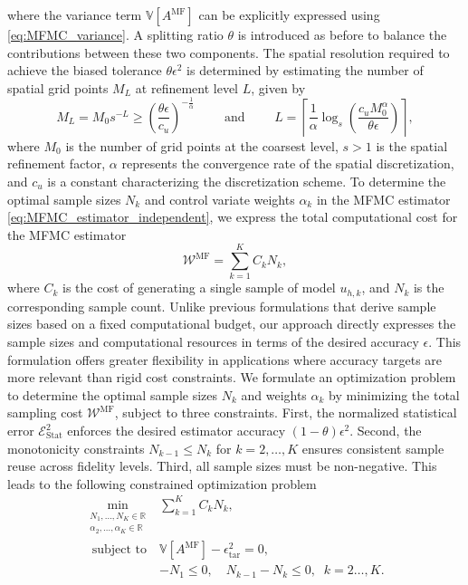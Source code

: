 %
where the variance term $\mathbb{V}[A^{\text{MF}}]$  can be explicitly expressed using \eqref{eq:MFMC_variance}. A splitting ratio $\theta$ is introduced as before to balance the contributions between these two components. The spatial resolution required to achieve the biased tolerance $\theta \epsilon^2$ is determined by estimating the number of spatial grid points $M_L$ at refinement level $L$, given by
%
\begin{equation}
    \label{eq:SLSGC_MLS_SpatialGridsNo}
    M_L = M_0s^{-L} \ge \left(\frac{\theta\epsilon}{c_u}\right)^{-\frac 1 {\alpha}} \qquad \text{ and } \qquad     L = \left\lceil \frac{1}{\alpha}\log_s \left(\frac{c_u M_0^\alpha}{\theta\epsilon}\right) \right\rceil,
\end{equation}
%
where $M_0$ is the number of grid points at the coarsest level, $s>1$ is the spatial refinement factor, $\alpha$ represents the convergence rate of the spatial discretization, and $c_u$ is a constant characterizing the discretization scheme. To determine the optimal sample sizes $N_k$ and control variate weights $\alpha_k$ in the MFMC estimator \eqref{eq:MFMC_estimator_independent}, we express the total computational cost for the MFMC estimator
%
\[
\mathcal{W}^{\text{MF}} = \sum_{k=1}^K C_kN_k,
\]
%
where $C_k$ is the cost of generating a single sample of model $u_{h,k}$, and $N_k$ is the corresponding sample count. Unlike previous formulations \cite{PeWiGu:2016} that derive sample sizes based on a fixed computational budget, our approach directly expresses the sample sizes and computational resources in terms of the desired accuracy $\epsilon$. This formulation offers greater flexibility in applications where accuracy targets are more relevant than rigid cost constraints. We formulate an optimization problem to determine the optimal sample sizes $N_k$ and weights $\alpha_k$ by minimizing the total sampling cost $\mathcal{W}^{\text{MF}}$, subject to three constraints. First, the normalized statistical error $\mathcal{E}_{\text{Stat}}^2$ enforces the desired estimator accuracy $(1-\theta)\epsilon^2$. Second,  the monotonicity constraints $N_{k-1}\le N_k$ for $k=2,\ldots, K$ ensures consistent sample reuse across fidelity levels. Third, all sample sizes must be non-negative. This leads to the following constrained optimization problem
%
\begin{equation}\label{eq:Optimization_pb_sample_size}
    \begin{array}{ll}
    \min \limits_{\begin{array}{c}\scriptstyle N_1,\ldots, N_K\in \mathbb{R} \\[-4pt]
\scriptstyle \alpha_2,\ldots,\alpha_K\in \mathbb{R}
\end{array}} &\displaystyle\sum\limits_{k=1}^K C_kN_k,\\
       \;\,\text{subject to} &\mathbb{V}\left[A^{\text{MF}}\right]- \epsilon_{\text{tar}}^2 = 0,\\[2pt]
       &\displaystyle -N_1\le 0,\quad \displaystyle N_{k-1}-N_k\le 0, \;\; k=2\ldots,K.
    \end{array}
\end{equation}
